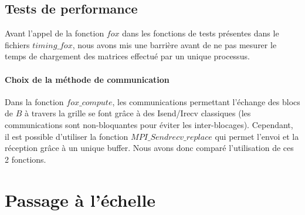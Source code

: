 \documentclass[12pt]{article}
\begin{document}
\subsection{Tests de performance}
Avant l'appel de la fonction $fox$ dans les fonctions de tests présentes dans le fichiers $timing\_fox$, nous avons mis une barrière avant de ne pas mesurer le temps de chargement des matrices effectué par un unique processus.

\paragraph{Choix de la méthode de communication}
Dans la fonction $fox\_compute$, les communications permettant l'échange des blocs de $B$ à travers la grille se font grâce à des Isend/Irecv classiques (les communications sont non-bloquantes pour éviter les inter-blocages). Cependant, il est possible d'utiliser la fonction $MPI\_Sendrecv\_replace$ qui permet l'envoi et la réception grâce à un unique buffer. Nous avons donc comparé l'utilisation de ces 2 fonctions.


\section{Passage à l'échelle}
\end{document}

